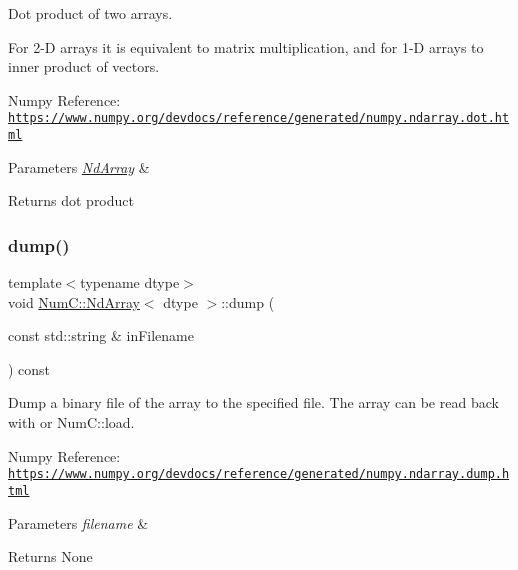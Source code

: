 Dot product of two arrays.

For 2-\/D arrays it is equivalent to matrix multiplication, and for 1-\/D arrays to inner product of vectors.

Numpy Reference\+: \href{https://www.numpy.org/devdocs/reference/generated/numpy.ndarray.dot.html}{\tt https\+://www.\+numpy.\+org/devdocs/reference/generated/numpy.\+ndarray.\+dot.\+html}


\begin{DoxyParams}{Parameters}
{\em \mbox{\hyperlink{class_num_c_1_1_nd_array}{Nd\+Array}}} & \\
\hline
\end{DoxyParams}
\begin{DoxyReturn}{Returns}
dot product 
\end{DoxyReturn}
\mbox{\label{class_num_c_1_1_nd_array_a647c9f590512193ad0de8257b1143396}} 
\subsubsection{\texorpdfstring{dump()}{dump()}}
{\footnotesize\ttfamily template$<$typename dtype$>$ \\
void \mbox{\hyperlink{class_num_c_1_1_nd_array}{Num\+C\+::\+Nd\+Array}}$<$ dtype $>$\+::dump (\begin{DoxyParamCaption}\item[{const std\+::string \&}]{in\+Filename }\end{DoxyParamCaption}) const\hspace{0.3cm}{\ttfamily [inline]}}

Dump a binary file of the array to the specified file. The array can be read back with or Num\+C\+::load.

Numpy Reference\+: \href{https://www.numpy.org/devdocs/reference/generated/numpy.ndarray.dump.html}{\tt https\+://www.\+numpy.\+org/devdocs/reference/generated/numpy.\+ndarray.\+dump.\+html}


\begin{DoxyParams}{Parameters}
{\em filename} & \\
\hline
\end{DoxyParams}
\begin{DoxyReturn}{Returns}
None 
\end{DoxyReturn}
\mbox{\label{class_num_c_1_1_nd_array_abe62fb75f8608717d211997f86d73735}} 
